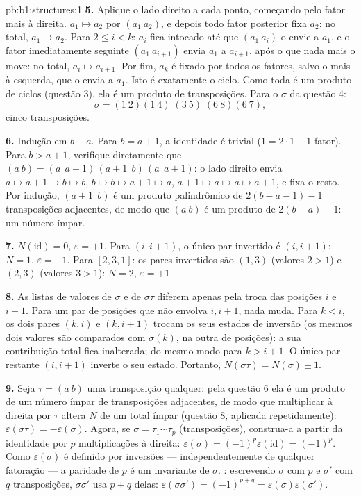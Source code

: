\begin{solution}{pb:b1:structures:1}
\textbf{5.} Aplique o lado direito a cada ponto, começando pelo fator
mais à direita. $a_1 \mapsto a_2$ por $(a_1\ a_2)$, e depois todo
fator posterior fixa $a_2$: no total, $a_1 \mapsto a_2$. Para $2 \leq i < k$:
$a_i$ fica intocado até que $(a_1\ a_i)$ o envie a $a_1$, e o
fator imediatamente seguinte $(a_1\ a_{i+1})$ envia $a_1$ a $a_{i+1}$, após
o que nada mais o move: no total, $a_i \mapsto a_{i+1}$. Por fim, $a_k$
é fixado por todos os fatores, salvo o mais à esquerda, que o envia a
$a_1$. Isto é exatamente o ciclo. Como toda  é um produto de
ciclos (questão 3), ela é um produto de transposições. Para o $\sigma$
da questão 4:
\[
\sigma = (1\ 2)(1\ 4)\;(3\ 5)\;(6\ 8)(6\ 7),
\]
cinco transposições.

\textbf{6.} Indução em $b - a$. Para $b = a + 1$, a identidade é
trivial ($1 = 2\cdot1 - 1$ fator). Para $b > a + 1$, verifique
diretamente que $(a\ b) = (a\ \ a{+}1)\,(a{+}1\ \ b)\,(a\ \ a{+}1)$:
o lado direito envia $a \mapsto a{+}1 \mapsto b \mapsto b$, $b
\mapsto b \mapsto a{+}1 \mapsto a$, $a{+}1 \mapsto a \mapsto a
\mapsto a{+}1$, e fixa o resto. Por indução, $(a{+}1\ \ b)$ é
um produto palindrômico de $2(b - a - 1) - 1$ transposições
adjacentes, de modo que $(a\ b)$ é um produto de $2(b - a) - 1$: um número
ímpar.

\textbf{7.} $N(\mathrm{id}) = 0$, $\varepsilon = +1$. Para $(i\ \
i{+}1)$, o único par invertido é $(i, i+1)$: $N = 1$,
$\varepsilon = -1$. Para $[2, 3, 1]$: os pares invertidos são $(1,
3)$ (valores $2 > 1$) e $(2, 3)$ (valores $3 > 1$): $N = 2$,
$\varepsilon = +1$.

\textbf{8.} As listas de valores de $\sigma$ e de $\sigma\tau$ diferem
apenas pela troca das posições $i$ e $i + 1$. Para um par de
posições que não envolva $i, i+1$, nada muda. Para $k < i$,
os dois pares $(k, i)$ e $(k, i+1)$ trocam os seus estados de
inversão (os mesmos dois valores são comparados com $\sigma(k)$, na
outra \omterm{def:b1:structures:order}{ordem} de posições): a sua contribuição total fica
inalterada; do mesmo modo para $k > i + 1$. O único par restante $(i,
i+1)$ inverte o seu estado. Portanto, $N(\sigma\tau) = N(\sigma) \pm 1$.

\textbf{9.} Seja $\tau = (a\ b)$ uma transposição qualquer: pela
questão 6 ela é um produto de um número ímpar de transposições
adjacentes, de modo que multiplicar à direita por $\tau$ altera $N$ de
um total ímpar (questão 8, aplicada repetidamente): $\varepsilon(\sigma
\tau) = -\varepsilon(\sigma)$. Agora, se $\sigma = \tau_1\cdots
\tau_p$ (transposições), construa-a a partir da identidade por $p$
multiplicações à direita: $\varepsilon(\sigma) =
(-1)^p\varepsilon(\mathrm{id}) = (-1)^p$. Como
$\varepsilon(\sigma)$ é definido por inversões --- independentemente
de qualquer fatoração --- a paridade de $p$ é um invariante de
$\sigma$. : escrevendo $\sigma$ com $p$ e $\sigma'$ com
$q$ transposições, $\sigma\sigma'$ usa $p + q$ delas:
$\varepsilon(\sigma\sigma') = (-1)^{p+q} =
\varepsilon(\sigma)\varepsilon(\sigma')$.


\end{solution}
